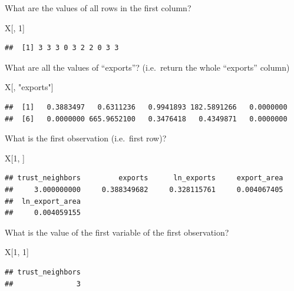 \documentclass[]{book}
\newenvironment{Shaded}{\begin{snugshade}}{\end{snugshade}}
\newcommand{\DecValTok}[1]{\textcolor[rgb]{0.00,0.00,0.81}{#1}}
\newcommand{\NormalTok}[1]{#1}
\newcommand{\StringTok}[1]{\textcolor[rgb]{0.31,0.60,0.02}{#1}}
\theoremstyle{definition}
\theoremstyle{definition}
\theoremstyle{definition}
\theoremstyle{remark}
\begin{document}
What are the values of all rows in the first column?

\begin{Shaded}
\begin{Highlighting}[]
\NormalTok{X[, }\DecValTok{1}\NormalTok{]}
\end{Highlighting}
\end{Shaded}

\begin{verbatim}
##  [1] 3 3 3 0 3 2 2 0 3 3
\end{verbatim}

What are all the values of ``exports''? (i.e.~return the whole ``exports'' column)

\begin{Shaded}
\begin{Highlighting}[]
\NormalTok{X[, }\StringTok{"exports"}\NormalTok{]}
\end{Highlighting}
\end{Shaded}

\begin{verbatim}
##  [1]   0.3883497   0.6311236   0.9941893 182.5891266   0.0000000
##  [6]   0.0000000 665.9652100   0.3476418   0.4349871   0.0000000
\end{verbatim}

What is the first observation (i.e.~first row)?

\begin{Shaded}
\begin{Highlighting}[]
\NormalTok{X[}\DecValTok{1}\NormalTok{, ]}
\end{Highlighting}
\end{Shaded}

\begin{verbatim}
## trust_neighbors         exports      ln_exports     export_area 
##     3.000000000     0.388349682     0.328115761     0.004067405 
##  ln_export_area 
##     0.004059155
\end{verbatim}

What is the value of the first variable of the first observation?

\begin{Shaded}
\begin{Highlighting}[]
\NormalTok{X[}\DecValTok{1}\NormalTok{, }\DecValTok{1}\NormalTok{]}
\end{Highlighting}
\end{Shaded}

\begin{verbatim}
## trust_neighbors 
##               3
\end{verbatim}
\end{document}
